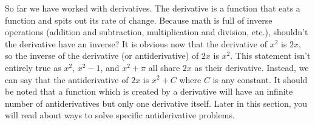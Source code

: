 \documentclass[../revisedmain.tex]{subfiles}
\begin{document}
So far we have worked with derivatives. The derivative is a function that eats a function and spits out its rate of change. Because math is full of inverse operations (addition and subtraction, multiplication and division, etc.), shouldn't the derivative have an inverse? It is obvious now that the derivative of $x^2$ is $2x$, so the inverse of the derivative (or antiderivative) of $2x$ is $x^2$. This statement isn't entirely true as $x^2$, $x^2-1$, and $x^2+\pi$ all share $2x$ as their derivative. Instead, we can say that the antiderivative of $2x$ is $x^2+C$ where $C$ is any constant. It should be noted that a function which is created by a derivative will have an infinite number of antiderivatives but only one derivative itself. Later in this section, you will read about ways to solve specific antiderivative problems.
\end{document}
